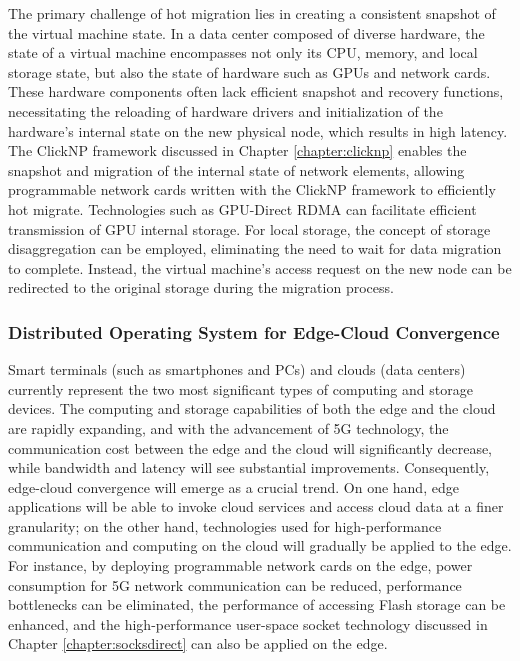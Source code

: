The primary challenge of hot migration lies in creating a consistent snapshot of the virtual machine state. In a data center composed of diverse hardware, the state of a virtual machine encompasses not only its CPU, memory, and local storage state, but also the state of hardware such as GPUs and network cards. These hardware components often lack efficient snapshot and recovery functions, necessitating the reloading of hardware drivers and initialization of the hardware's internal state on the new physical node, which results in high latency. The ClickNP framework discussed in Chapter \ref{chapter:clicknp} enables the snapshot and migration of the internal state of network elements, allowing programmable network cards written with the ClickNP framework to efficiently hot migrate. Technologies such as GPU-Direct RDMA can facilitate efficient transmission of GPU internal storage. For local storage, the concept of storage disaggregation can be employed, eliminating the need to wait for data migration to complete. Instead, the virtual machine's access request on the new node can be redirected to the original storage during the migration process.

\subsubsection{Distributed Operating System for Edge-Cloud Convergence}
\label{future:distributed-linux}

Smart terminals (such as smartphones and PCs) and clouds (data centers) currently represent the two most significant types of computing and storage devices. The computing and storage capabilities of both the edge and the cloud are rapidly expanding, and with the advancement of 5G technology, the communication cost between the edge and the cloud will significantly decrease, while bandwidth and latency will see substantial improvements. Consequently, edge-cloud convergence will emerge as a crucial trend. On one hand, edge applications will be able to invoke cloud services and access cloud data at a finer granularity; on the other hand, technologies used for high-performance communication and computing on the cloud will gradually be applied to the edge. For instance, by deploying programmable network cards on the edge, power consumption for 5G network communication can be reduced, performance bottlenecks can be eliminated, the performance of accessing Flash storage can be enhanced, and the high-performance user-space socket technology discussed in Chapter \ref{chapter:socksdirect} can also be applied on the edge.

